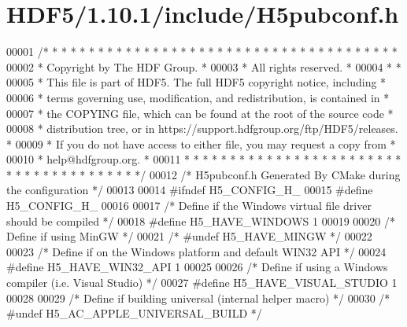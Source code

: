 \hypertarget{_h_d_f5_21_810_81_2include_2_h5pubconf_8h_source}{}\section{H\+D\+F5/1.10.1/include/\+H5pubconf.h}
\label{_h_d_f5_21_810_81_2include_2_h5pubconf_8h_source}

\begin{DoxyCode}
00001 \textcolor{comment}{/* * * * * * * * * * * * * * * * * * * * * * * * * * * * * * * * * * * * * * *}
00002 \textcolor{comment}{ * Copyright by The HDF Group.                                               *}
00003 \textcolor{comment}{ * All rights reserved.                                                      *}
00004 \textcolor{comment}{ *                                                                           *}
00005 \textcolor{comment}{ * This file is part of HDF5.  The full HDF5 copyright notice, including     *}
00006 \textcolor{comment}{ * terms governing use, modification, and redistribution, is contained in    *}
00007 \textcolor{comment}{ * the COPYING file, which can be found at the root of the source code       *}
00008 \textcolor{comment}{ * distribution tree, or in https://support.hdfgroup.org/ftp/HDF5/releases.  *}
00009 \textcolor{comment}{ * If you do not have access to either file, you may request a copy from     *}
00010 \textcolor{comment}{ * help@hdfgroup.org.                                                        *}
00011 \textcolor{comment}{ * * * * * * * * * * * * * * * * * * * * * * * * * * * * * * * * * * * * * * */}
00012 \textcolor{comment}{/* H5pubconf.h  Generated By CMake during the configuration */}
00013 
00014 \textcolor{preprocessor}{#ifndef H5\_CONFIG\_H\_}
00015 \textcolor{preprocessor}{#define H5\_CONFIG\_H\_}
00016 
00017 \textcolor{comment}{/* Define if the Windows virtual file driver should be compiled */}
00018 \textcolor{preprocessor}{#define H5\_HAVE\_WINDOWS 1}
00019 
00020 \textcolor{comment}{/* Define if using MinGW */}
00021 \textcolor{comment}{/* #undef H5\_HAVE\_MINGW */}
00022 
00023 \textcolor{comment}{/* Define if on the Windows platform and default WIN32 API */}
00024 \textcolor{preprocessor}{#define H5\_HAVE\_WIN32\_API 1}
00025 
00026 \textcolor{comment}{/* Define if using a Windows compiler (i.e. Visual Studio) */}
00027 \textcolor{preprocessor}{#define H5\_HAVE\_VISUAL\_STUDIO 1}
00028 
00029 \textcolor{comment}{/* Define if building universal (internal helper macro) */}
00030 \textcolor{comment}{/* #undef H5\_AC\_APPLE\_UNIVERSAL\_BUILD */}

\end{DoxyCode}
